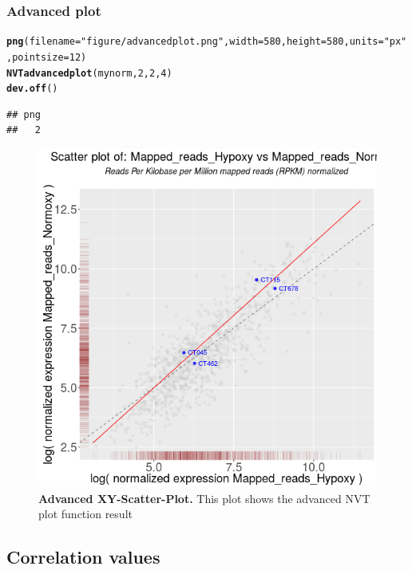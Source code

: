 \documentclass[11pt]{article}\usepackage[]{graphicx}\usepackage[]{color}
\makeatletter
\newcommand{\hlnum}[1]{\textcolor[rgb]{0.686,0.059,0.569}{#1}}%
\newcommand{\hlstr}[1]{\textcolor[rgb]{0.192,0.494,0.8}{#1}}%
\newcommand{\hlstd}[1]{\textcolor[rgb]{0.345,0.345,0.345}{#1}}%
\newcommand{\hlkwc}[1]{\textcolor[rgb]{0.333,0.667,0.333}{#1}}%
\newcommand{\hlkwd}[1]{\textcolor[rgb]{0.737,0.353,0.396}{\textbf{#1}}}%
\newenvironment{kframe}{%
 \def\at@end@of@kframe{}%
 \ifinner\ifhmode%
  \def\at@end@of@kframe{\end{minipage}}%
  \begin{minipage}{\columnwidth}%
 \fi\fi%
 \def\FrameCommand##1{\hskip\@totalleftmargin \hskip-\fboxsep
 \colorbox{shadecolor}{##1}\hskip-\fboxsep
     \hskip-\linewidth \hskip-\@totalleftmargin \hskip\columnwidth}%
 \MakeFramed {\advance\hsize-\width
   \@totalleftmargin\z@ \linewidth\hsize
   \@setminipage}}%
 {\par\unskip\endMakeFramed%
 \at@end@of@kframe}
\newenvironment{knitrout}{}{} %
\makeatother
\begin{document}
\subsubsection{Advanced plot}

\begin{knitrout}
\color{fgcolor}\begin{kframe}
\begin{alltt}
\hlkwd{png}\hlstd{(}\hlkwc{filename} \hlstd{=} \hlstr{"figure/advancedplot.png"}\hlstd{,} \hlkwc{width} \hlstd{=} \hlnum{580}\hlstd{,} \hlkwc{height} \hlstd{=} \hlnum{580}\hlstd{,} \hlkwc{units} \hlstd{=} \hlstr{"px"}\hlstd{,} \hlkwc{pointsize} \hlstd{=} \hlnum{12}\hlstd{)}
\hlkwd{NVTadvancedplot}\hlstd{(mynorm,}\hlnum{2}\hlstd{,}\hlnum{2}\hlstd{,}\hlnum{4}\hlstd{)}
\hlkwd{dev.off}\hlstd{()}
\end{alltt}
\begin{verbatim}
## png 
##   2
\end{verbatim}
\end{kframe}
\end{knitrout}

\begin{figure}
\centering
\includegraphics[width=.8\textwidth]{figure/advancedplot}
\caption{
  \textbf{Advanced XY-Scatter-Plot.}
  This plot shows the advanced NVT plot function result}
\label{fig:MA}
\end{figure}

\subsection{Correlation values}
\end{document}
